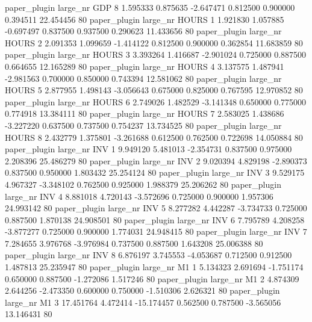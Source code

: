        paper_plugin   large_nr      GDP                 8  1.595333  0.875635  -2.647471 0.812500 0.900000  0.394511   22.454456 80
       paper_plugin   large_nr    HOURS                 1  1.921830  1.057885  -0.697497 0.837500 0.937500  0.290623   11.433656 80
       paper_plugin   large_nr    HOURS                 2  2.091353  1.099659  -1.414122 0.812500 0.900000  0.362854   11.683859 80
       paper_plugin   large_nr    HOURS                 3  3.393264  1.416687  -2.901024 0.725000 0.887500  0.664655   12.165289 80
       paper_plugin   large_nr    HOURS                 4  3.137575  1.487941  -2.981563 0.700000 0.850000  0.743394   12.581062 80
       paper_plugin   large_nr    HOURS                 5  2.877955  1.498143  -3.056643 0.675000 0.825000  0.767595   12.970852 80
       paper_plugin   large_nr    HOURS                 6  2.749026  1.482529  -3.141348 0.650000 0.775000  0.774918   13.384111 80
       paper_plugin   large_nr    HOURS                 7  2.583025  1.438686  -3.227220 0.637500 0.737500  0.754237   13.734525 80
       paper_plugin   large_nr    HOURS                 8  2.432779  1.375801  -3.261688 0.612500 0.762500  0.722698   14.050884 80
       paper_plugin   large_nr      INV                 1  9.949120  5.481013  -2.354731 0.837500 0.975000  2.208396   25.486279 80
       paper_plugin   large_nr      INV                 2  9.020394  4.829198  -2.890373 0.837500 0.950000  1.803432   25.254124 80
       paper_plugin   large_nr      INV                 3  9.529175  4.967327  -3.348102 0.762500 0.925000  1.988379   25.206262 80
       paper_plugin   large_nr      INV                 4  8.881018  4.720143  -3.572696 0.725000 0.900000  1.957306   24.993142 80
       paper_plugin   large_nr      INV                 5  8.277282  4.442287  -3.734733 0.725000 0.887500  1.870138   24.908501 80
       paper_plugin   large_nr      INV                 6  7.795789  4.208258  -3.877277 0.725000 0.900000  1.774031   24.948415 80
       paper_plugin   large_nr      INV                 7  7.284655  3.976768  -3.976984 0.737500 0.887500  1.643208   25.006388 80
       paper_plugin   large_nr      INV                 8  6.876197  3.745553  -4.053687 0.712500 0.912500  1.487813   25.235947 80
       paper_plugin   large_nr       M1                 1  5.134323  2.691694  -1.751174 0.650000 0.887500 -1.272086    1.517246 80
       paper_plugin   large_nr       M1                 2  4.874309  2.644256  -2.473350 0.600000 0.750000 -1.510306    2.626321 80
       paper_plugin   large_nr       M1                 3 17.451764  4.472414 -15.174457 0.562500 0.787500 -3.565056   13.146431 80

